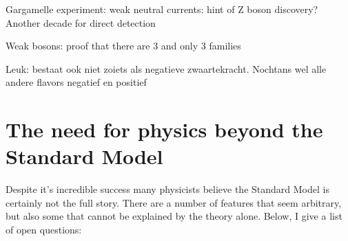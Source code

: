 Gargamelle experiment: weak neutral currents: hint of Z boson discovery? Another decade for direct detection

Weak bosons: proof that there are 3 and only 3 families



Leuk: bestaat ook niet zoiets als negatieve zwaartekracht. Nochtans wel alle andere flavors negatief en positief


\section{The need for physics beyond the Standard Model}
Despite it's incredible success many physicists believe the Standard Model is certainly not the full story. There are a number of features that seem arbitrary, but also some that cannot be explained by the theory alone. Below, I give a list of open questions:

